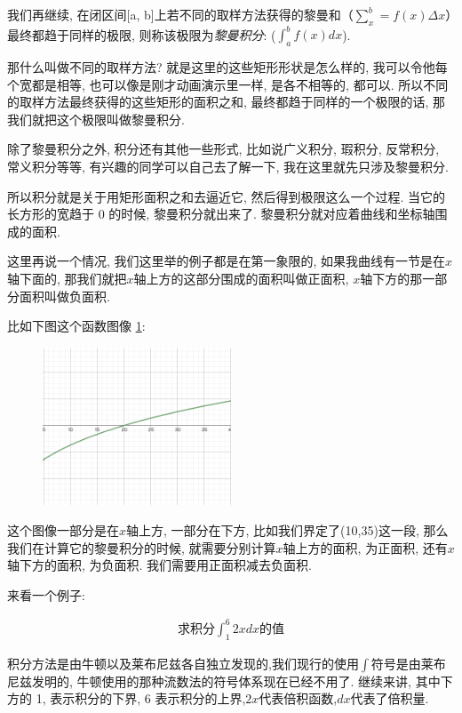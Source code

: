 我们再继续, 在闭区间[a, b]上若不同的取样方法获得的黎曼和（$\sum_x^b = f(x)\Delta x$）最终都趋于同样的极限, 则称该极限为\textit{黎曼积分}: ($\int _a^b f(x)dx$). 

那什么叫做不同的取样方法? 就是这里的这些矩形形状是怎么样的, 我可以令他每个宽都是相等, 也可以像是刚才动画演示里一样, 是各不相等的, 都可以. 所以不同的取样方法最终获得的这些矩形的面积之和, 最终都趋于同样的一个极限的话, 那我们就把这个极限叫做黎曼积分. 

除了黎曼积分之外, 积分还有其他一些形式, 比如说广义积分, 瑕积分, 反常积分, 常义积分等等, 有兴趣的同学可以自己去了解一下, 我在这里就先只涉及黎曼积分. 

所以积分就是关于用矩形面积之和去逼近它, 然后得到极限这么一个过程. 当它的长方形的宽趋于 0 的时候, 黎曼积分就出来了. 黎曼积分就对应着曲线和坐标轴围成的面积. 

这里再说一个情况, 我们这里举的例子都是在第一象限的, 如果我曲线有一节是在$x$轴下面的, 那我们就把$x$轴上方的这部分围成的面积叫做正面积, $x$轴下方的那一部分面积叫做负面积.  

比如下图这个函数图像 \ref{fig:img13_12}:

\begin{figure}[ht]
  \centering
  \includegraphics[width=0.5\textwidth]{asset/20230903195333.png}
  \caption{}
  \label{fig:img13_12}
\end{figure}

这个图像一部分是在$x$轴上方, 一部分在下方, 比如我们界定了(10,35)这一段, 那么我们在计算它的黎曼积分的时候, 就需要分别计算$x$轴上方的面积, 为正面积, 还有$x$轴下方的面积, 为负面积. 我们需要用正面积减去负面积. 

来看一个例子:

\begin{align*}
  \mbox{求积分}\int_1^6 2xdx\mbox{的值}
\end{align*}

积分方法是由牛顿以及莱布尼兹各自独立发现的,我们现行的使用$\int$符号是由莱布尼兹发明的, 牛顿使用的那种流数法的符号体系现在已经不用了. 继续来讲, 其中下方的 1, 表示积分的下界, 6 表示积分的上界,$2x$代表倍积函数,$dx$代表了倍积量. 

